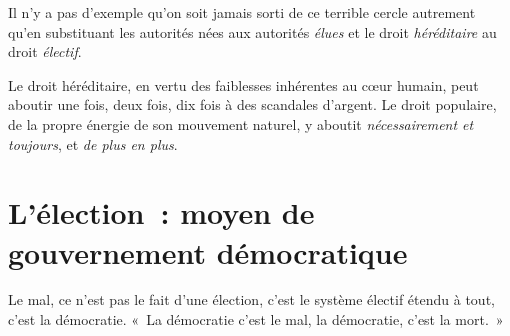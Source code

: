 \documentclass[french,twoside]{book} %
\newcommand{\astermono}{\medskip\centerline{\color{rubric}\large\selectfont{\syms ✻}}\medskip\par}%
\begin{document}
Il n’y a pas d’exemple qu’on soit jamais sorti de ce terrible cercle autrement qu’en substituant les autorités nées aux autorités \emph{élues} et le droit \emph{héréditaire} au droit \emph{électif}.\par
Le droit héréditaire, en vertu des faiblesses inhérentes au cœur humain, peut aboutir une fois, deux fois, dix fois à des scandales d’argent. Le droit populaire, de la propre énergie de son mouvement naturel, y aboutit \emph{nécessairement et toujours}, et \emph{de plus en plus}.
\section[L’élection : moyen de gouvernement démocratique]{L’élection : moyen de gouvernement démocratique}
\noindent Le mal, ce n’est pas le fait d’une élection, c’est le système électif étendu à tout, c’est la démocratie. « La démocratie c’est le mal, la démocratie, c’est la mort. »\par

\astermono
\end{document}
